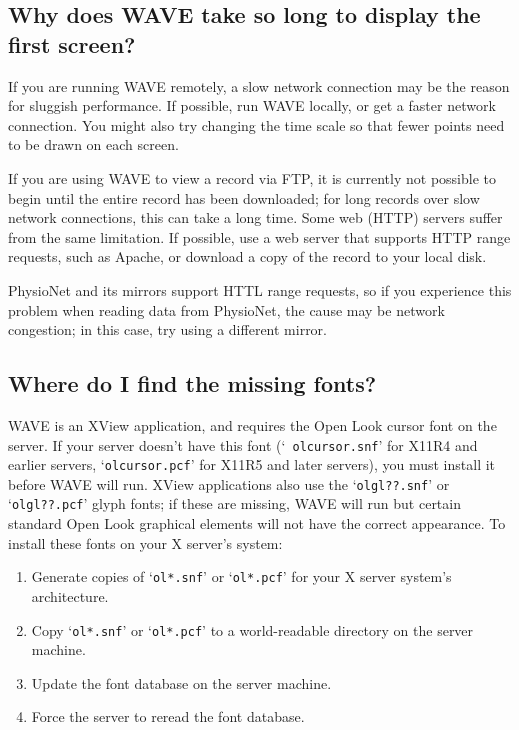 \documentclass[twoside]{book}
\newcommand{\WAVE}{{\sf WAVE}\xspace}
\begin{document}
\subsection{Why does \WAVE{} take so long to display the first screen?}

If you are running \WAVE{} remotely, a slow network connection may be the
reason for sluggish performance.  If possible, run \WAVE{} locally, or get
a faster network connection.  You might also try changing the time scale
so that fewer points need to be drawn on each screen.

If you are using \WAVE{} to view a record via FTP, it is currently not possible
to begin until the entire record has been downloaded;  for long records over
slow network connections, this can take a long time.  Some web (HTTP) servers
suffer from the same limitation.  If possible, use a web server that supports
HTTP range requests, such as Apache, or download a copy of the record to your
local disk.

PhysioNet and its mirrors support HTTL range requests, so if you experience
this problem when reading data from PhysioNet, the cause may be network
congestion;  in this case, try using a different mirror.

\subsection{Where do I find the missing fonts?}

\label{faq:missing-fonts}
\WAVE{} is an XView
application, and requires the Open Look cursor font
on the server.  If your server doesn't have this font (`{\tt
olcursor.snf}' for X11R4 and earlier servers, `{\tt olcursor.pcf}' for
X11R5 and later servers), you must install it before \WAVE{} will run.
XView applications also use the `{\tt olgl??.snf}' or `{\tt olgl??.pcf}'
glyph fonts; if these are missing, \WAVE{} will run but certain standard
Open Look graphical elements will not have the correct appearance.  To
install these fonts on your X server's system:

\begin{enumerate}

\item
Generate copies of `{\tt ol*.snf}' or `{\tt ol*.pcf}' for your X server
system's architecture.

\item
Copy `{\tt ol*.snf}' or `{\tt ol*.pcf}' to a world-readable directory on the
server machine.

\item
Update the font database on the server machine.

\item
Force the server to reread the font database.
\end{enumerate}
\end{document}
